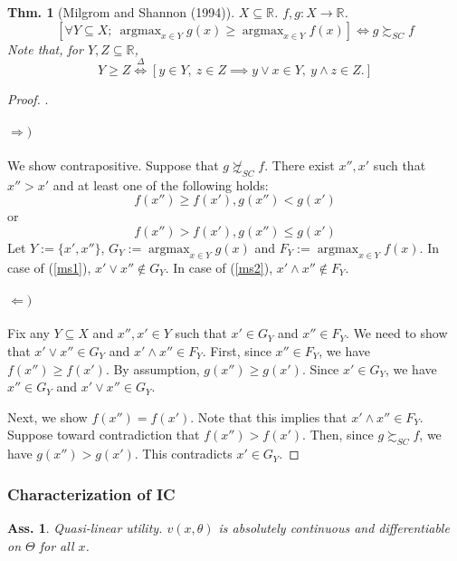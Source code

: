 \documentclass[11pt,a4paper,dvipdfmx]{article}
\theoremstyle{plain}
\newtheorem{thm}{Thm.}[section]
\newtheorem{ass}{Ass.}
\newcommand{\R}{\mathbb{R}}
\newcommand{\defi}{\stackrel{\Delta}{\Longleftrightarrow}}
\newcommand{\equi}{\Longleftrightarrow}
\newcommand{\1}{\mathbbm{1}}
\DeclareMathOperator*{\argmax}{argmax}
\begin{document}
\begin{thm}[Milgrom and Shannon (1994)]
	$X \subseteq \R$. $f,g: X \to \R$.
	\[
	[\forall Y \subseteq X; \ \argmax_{x \in Y} g(x) \geq \argmax_{x \in Y} f(x)
	]
	\equi g \succsim_{SC} f
	\]
	Note that, for $Y,Z \subseteq \R$,
	\[
	Y \geq Z
	\defi  [y \in Y, \ z \in Z
	\implies y \vee x \in Y, \ y \wedge z \in Z.
	]
	\]
\end{thm}
\begin{proof}.
	\paragraph{$\Rightarrow)$}
	We show contrapositive. Suppose that $g \not\succsim_{SC} f$.
	There exist $x'', x'$ such that $x'' > x'$ and at least one of the following holds:
	\begin{equation}
		f(x'') \geq f(x'), g(x'') < g(x') \label{ms1}
	\end{equation}
	or
	\begin{equation}
		f(x'') > f(x'), g(x'') \leq g(x') \label{ms2}
	\end{equation}
	Let $Y := \{x', x''\}$, $G_Y := \argmax_{x \in Y} g(x)$ and $F_Y := \argmax_{x \in Y} f(x)$.
	In case of (\ref{ms1}), $x' \vee x'' \notin G_Y$. In case of (\ref{ms2}), $x' \wedge x'' \notin F_Y$.
	
	\paragraph{$\Leftarrow)$}
	Fix any $Y \subseteq X$ and $x'', x' \in Y$ such that $x' \in G_Y$ and $x'' \in F_Y$. We need to show that $x' \vee x'' \in G_Y$ and $x' \wedge x'' \in F_Y$.
	First, since $x'' \in F_Y$, we have $f(x'') \geq f(x')$. By assumption, $g(x'') \geq g(x')$. Since $x' \in G_Y$, we have $x'' \in G_Y$ and $x' \vee x'' \in G_Y$.
	
	Next, we show $f(x'') = f(x')$. Note that this implies that $x' \wedge x'' \in F_Y$. 
	Suppose toward contradiction that $f(x'') > f(x')$. Then, since $g \succsim_{SC} f$, we have $g(x'') > g(x')$. This contradicts $x' \in G_Y$.
\end{proof}


\subsubsection{Characterization of IC}
\begin{ass}
	Quasi-linear utility. $v(x, \theta)$ is absolutely continuous and differentiable on $\Theta$ for all $x$.
\end{ass}
\end{document}
